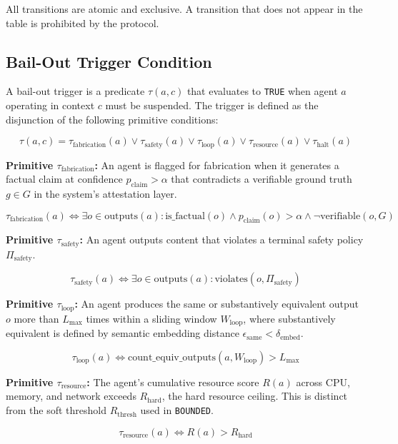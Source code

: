 All transitions are atomic and exclusive. A transition that does not appear in the table is prohibited by the protocol.

\subsection{Bail-Out Trigger Condition}

A bail-out trigger is a predicate $\tau(a, c)$ that evaluates to \texttt{TRUE} when agent $a$ operating in context $c$ must be suspended. The trigger is defined as the disjunction of the following primitive conditions:

\[
\tau(a, c) = \tau_{\text{fabrication}}(a) \lor \tau_{\text{safety}}(a) \lor \tau_{\text{loop}}(a) \lor \tau_{\text{resource}}(a) \lor \tau_{\text{halt}}(a)
\]

\bigskip
\noindent\textbf{Primitive $\tau_{\text{fabrication}}$:} An agent is flagged for fabrication when it generates a factual claim at confidence $p_{\text{claim}} > \alpha$ that contradicts a verifiable ground truth $g \in G$ in the system's attestation layer.

\[
\tau_{\text{fabrication}}(a) \iff \exists o \in \text{outputs}(a): \text{is\_factual}(o) \land p_{\text{claim}}(o) > \alpha \land \neg \text{verifiable}(o, G)
\]

\bigskip
\noindent\textbf{Primitive $\tau_{\text{safety}}$:} An agent outputs content that violates a terminal safety policy $\Pi_{\text{safety}}$.

\[
\tau_{\text{safety}}(a) \iff \exists o \in \text{outputs}(a): \text{violates}(o, \Pi_{\text{safety}})
\]

\bigskip
\noindent\textbf{Primitive $\tau_{\text{loop}}$:} An agent produces the same or substantively equivalent output $o$ more than $L_{\max}$ times within a sliding window $W_{\text{loop}}$, where substantively equivalent is defined by semantic embedding distance $\epsilon_{\text{same}} < \delta_{\text{embed}}$.

\[
\tau_{\text{loop}}(a) \iff \text{count\_equiv\_outputs}(a, W_{\text{loop}}) > L_{\max}
\]

\bigskip
\noindent\textbf{Primitive $\tau_{\text{resource}}$:} The agent's cumulative resource score $R(a)$ across CPU, memory, and network exceeds $R_{\text{hard}}$, the hard resource ceiling. This is distinct from the soft threshold $R_{\text{thresh}}$ used in \texttt{BOUNDED}.

\[
\tau_{\text{resource}}(a) \iff R(a) > R_{\text{hard}}
\]

